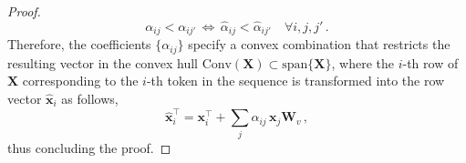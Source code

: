 \begin{proof}
\begin{equation}
     \alpha_{ij} < \alpha_{ij'} \,  \Leftrightarrow \,\hat{\alpha}_{ij} < \hat{\alpha}_{ij'}\quad \forall i,j, j' \,.
\end{equation}
%
Therefore, the coefficients $\{\alpha_{ij}\}$ specify a convex combination that restricts the resulting vector in the convex hull $\text{Conv}(\bm{X}) \subset \text{span}\{\bm{X}\}$, where the $i$-th row of $\bm{X}$ corresponding to the $i$-th token in the sequence is transformed into the row vector $\hat{\bm{x}}_i$ as follows,
%
\begin{equation}
\hat{\bm{x}}^\top_i = \bm{x}^\top_i + \sum_j\alpha_{ij}\,\bm{x}_j\bm{W}_v\,,
\end{equation}
%
thus concluding the proof.
% 
\end{proof}
